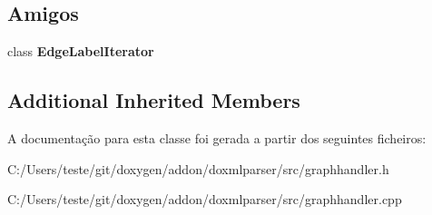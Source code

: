 \subsection*{Amigos}
\begin{DoxyCompactItemize}
\item 
\hypertarget{class_child_node_handler_af04914e6743dfa65bd97548d5db241fc}{class {\bfseries Edge\-Label\-Iterator}}\label{class_child_node_handler_af04914e6743dfa65bd97548d5db241fc}

\end{DoxyCompactItemize}
\subsection*{Additional Inherited Members}


A documentação para esta classe foi gerada a partir dos seguintes ficheiros\-:\begin{DoxyCompactItemize}
\item 
C\-:/\-Users/teste/git/doxygen/addon/doxmlparser/src/graphhandler.\-h\item 
C\-:/\-Users/teste/git/doxygen/addon/doxmlparser/src/graphhandler.\-cpp\end{DoxyCompactItemize}

